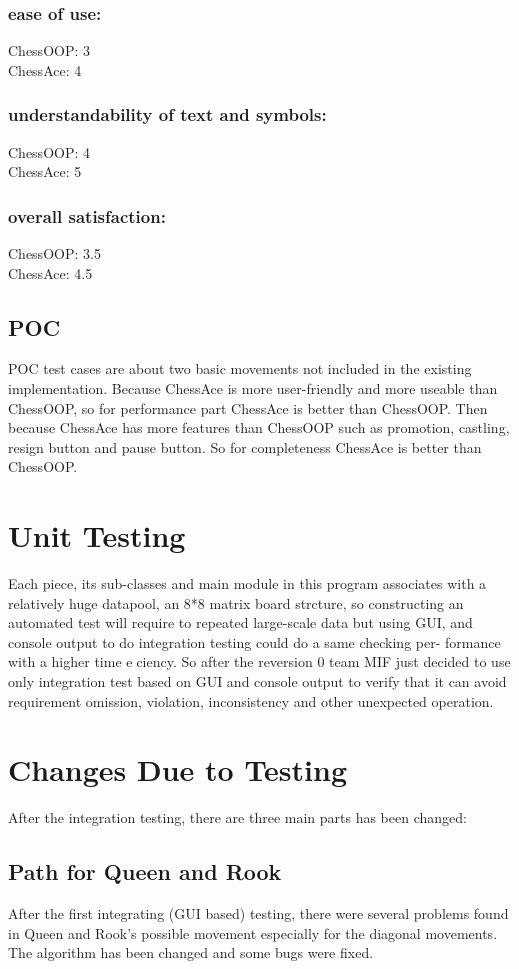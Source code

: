 \documentclass[12pt, titlepage]{article}
\begin{document}
\subsubsection{ease of use:}
ChessOOP: 3\\
ChessAce: 4\\
\subsubsection{understandability of text and symbols:}
ChessOOP: 4\\
ChessAce: 5\\
\subsubsection{overall satisfaction:}
ChessOOP: 3.5\\
ChessAce: 4.5\\

\subsection{POC}
POC test cases are about two basic movements not included in the existing implementation.
Because ChessAce is more user-friendly and more useable than ChessOOP, so for performance part ChessAce is better than ChessOOP. Then because ChessAce has more features than ChessOOP such as promotion, castling, resign button and pause button. So for completeness ChessAce is better than ChessOOP.  


\section{Unit Testing}
Each piece, its sub-classes and main module in this program associates with
a relatively huge datapool, an 8*8 matrix board strcture, so constructing
an automated test will require to repeated large-scale data but using GUI,
and console output to do integration testing could do a same checking per-
formance with a higher time eciency. So after the reversion 0 team MIF
just decided to use only integration test based on GUI and console output
to verify that it can avoid requirement omission, violation, inconsistency and
other unexpected operation.
\section{Changes Due to Testing}
After the integration testing, there are three main parts has been changed:
\subsection{Path for Queen and Rook}
After the first integrating (GUI based) testing, there were several problems found in Queen and Rook's possible movement especially for the diagonal movements. The algorithm has been changed and some bugs were fixed. \\
\end{document}
